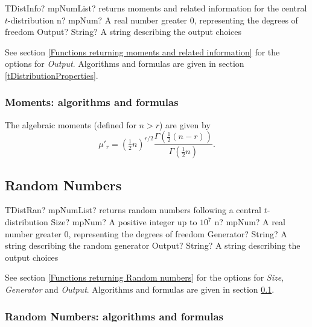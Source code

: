 \begin{mpFunctionsExtract}
	\mpFunctionTwo
	{TDistInfo? mpNumList? returns moments and related information for the central $t$-distribution}
	{n? mpNum? A real number greater 0, representing the degrees of freedom}
	{Output? String? A string describing the output choices}
\end{mpFunctionsExtract}

\vspace{0.3cm}

See section \ref{Functions returning moments and related information} for the options for {\itshape\sffamily Output}. Algorithms and formulas are given in section \ref{tDistributionProperties}.



\subsubsection{Moments: algorithms and formulas}

The algebraic moments (defined for $n>r$) are given by
\begin{equation}
	\mu'_r = \left({\tfrac{1}{2}n}\right)^{r/2} \frac{\Gamma\left(\tfrac{1}{2}(n-r)\right)}{\Gamma\left(\tfrac{1}{2}n\right)}.
\end{equation}



\subsection{Random Numbers}
\label{tDistributionRandom}

\begin{mpFunctionsExtract}
	\mpFunctionFour
	{TDistRan? mpNumList? returns random numbers following a central $t$-distribution}
	{Size? mpNum? A positive integer up to $10^7$}
	{n? mpNum? A real number greater 0, representing the degrees of freedom}
	{Generator? String? A string describing the random generator}
	{Output? String? A string describing the output choices}
\end{mpFunctionsExtract}

\vspace{0.3cm}

See section \ref{Functions returning Random numbers} for the options for  {\itshape\sffamily Size},  {\itshape\sffamily Generator} and {\itshape\sffamily Output}. Algorithms and formulas are given in section \ref{tDistributionRandom}.


\subsubsection{Random Numbers: algorithms and formulas}

